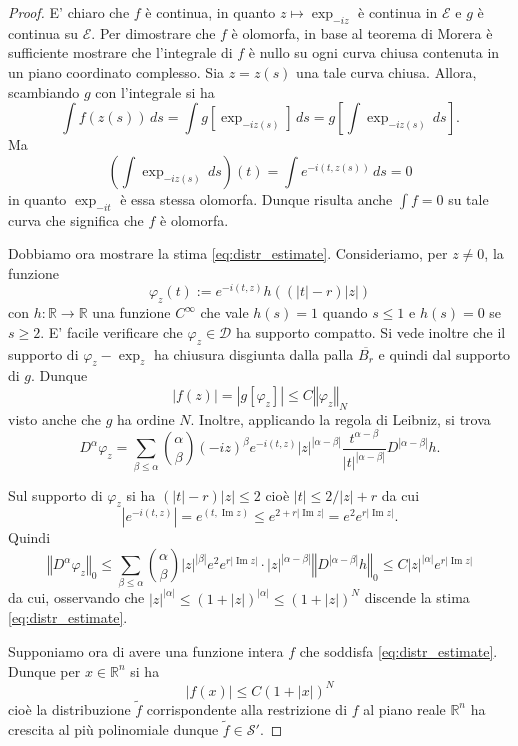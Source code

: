 \documentclass[italian,a4paper,oneside,headinclude]{scrbook}
\renewcommand{\phi}{\varphi}
\newcommand{\D}{\mathcal D}
\newcommand{\E}{\mathcal E}
\renewcommand{\S}{\mathcal S}
\newcommand{\RR}{\mathbb R}
\newcommand{\abs}[1]{{\left|#1\right|}}
\newcommand{\Abs}[1]{{\left\Vert #1\right\Vert}}
\newcommand{\defeq}{:=}
\DeclareMathOperator{\Imaginarypart}{Im}
\renewcommand{\Im}{\Imaginarypart}
\begin{document}
\begin{proof}
  E' chiaro che $f$ è continua, in quanto $z\mapsto \exp_{-iz}$ è continua
  in $\E$ e $g$ è continua su $\E$.
  Per dimostrare che $f$ è olomorfa, in base al teorema di Morera è
  sufficiente mostrare che l'integrale di $f$ è nullo su ogni curva
  chiusa contenuta in un piano coordinato complesso.
  Sia $z=z(s)$ una tale curva chiusa.
  Allora, scambiando $g$ con l'integrale
  si ha
  \[
  \int f(z(s))\, ds
  = \int g[\exp_{-iz(s)}]\, ds
  = g\left[\int \exp_{-iz(s)}\, ds\right].
  \]
  Ma
  \[
  \left(\int \exp_{-iz(s)}\, ds\right)(t)
  = \int e^{-i(t,z(s))}\, ds = 0
  \]
  in quanto $\exp_{-it}$ è essa stessa olomorfa.
  Dunque risulta anche $\int f=0$ su tale curva che significa che $f$ è
  olomorfa.

  Dobbiamo ora mostrare la stima \eqref{eq:distr_estimate}.
  Consideriamo, per $z\neq 0$, la funzione
  \[
  \phi_z(t) \defeq e^{-i(t,z)} h((\abs{t}-r)\abs{z})
  \]
  con $h\colon \RR\to\RR$ una funzione $C^\infty$ che vale $h(s)=1$
  quando $s\le 1$ e $h(s)=0$ se $s\ge 2$.
  E' facile verificare che $\phi_z\in \D$ ha supporto compatto.
  Si vede inoltre che il supporto di $\phi_z - \exp_{z}$ ha chiusura disgiunta
  dalla palla $\overline{B_r}$ e quindi dal supporto di $g$.
  Dunque
  \[
  \abs{f(z)}
  = \abs{g[\phi_z]}
  \le C \Abs{\phi_z}_N
  \]
  visto anche che $g$ ha ordine $N$.
  Inoltre, applicando la regola di Leibniz, si trova
  \[
  D^\alpha \phi_z
  = \sum_{\beta\le \alpha}{\alpha \choose \beta}
  (-iz)^\beta e^{-i(t,z)} \abs{z}^{\abs{\alpha-\beta}}
  \frac{t^{\alpha-\beta}}{\abs{t}^{\abs{\alpha-\beta}}}
  D^{\abs{\alpha-\beta}}h.
  \]


  Sul supporto di $\phi_z$ si ha $(\abs{t}-r)\abs{z}\le 2$
  cioè $\abs{t} \le 2/\abs{z} + r$ da cui
  \[
  \abs{e^{-i(t,z)}} = e^{(t,\Im z)} \le e^{2 + r\abs{\Im z}}
  = e^2 e^{r\abs{\Im z}}.
  \]
  Quindi
  \[
  \Abs{D^\alpha\phi_z}_0
  \le \sum_{\beta\le \alpha}{\alpha \choose \beta}
  \abs{z}^{\abs\beta} e^2 e^{r\abs{\Im z}} \cdot \abs{z}^{\abs{\alpha-\beta}}
  \Abs{D^{\abs{\alpha-\beta}}h}_0
  \le C \abs{z}^\abs{\alpha} e^{r\abs{\Im z}}
  \]
  da cui, osservando che
  $\abs{z}^{\abs{\alpha}} \le (1+\abs{z})^{\abs{\alpha}} \le (1+\abs{z})^N$
  discende la stima \eqref{eq:distr_estimate}.

  Supponiamo ora di avere una funzione intera $f$ che soddisfa
  \eqref{eq:distr_estimate}.
  Dunque per $x\in \RR^n$ si ha
  \[
  \abs{f(x)} \le C(1+\abs{x})^N
  \]
  cioè la distribuzione $\tilde f$ corrispondente alla restrizione di $f$
  al piano reale $\RR^n$ ha crescita
  al più polinomiale dunque $\tilde f \in \S'$.


\end{proof}
\end{document}
